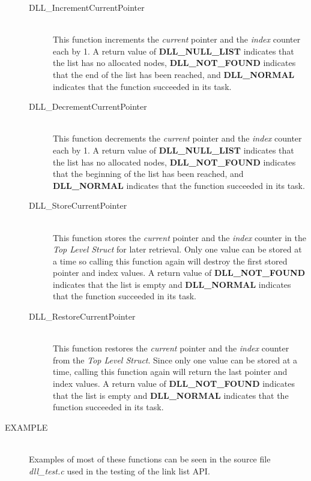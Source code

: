 \documentclass[10pt,letterpaper,titlepage]{article}
\begin{document}
\begin{description}
\begin{description}
\item[DLL\_IncrementCurrentPointer]\quad\\
 This function increments the \emph{current} pointer and the \emph{index} counter each by 1.  A return value of \textbf{DLL\_NULL\_LIST} indicates that the list has no allocated nodes, \textbf{DLL\_NOT\_FOUND} indicates that the end of the list has been reached, and \textbf{DLL\_NORMAL} indicates that the function succeeded in its task.

\item[DLL\_DecrementCurrentPointer]\quad\\
 This function decrements the \emph{current} pointer and the \emph{index} counter each by 1.  A return value of \textbf{DLL\_NULL\_LIST} indicates that the list has no allocated nodes, \textbf{DLL\_NOT\_FOUND} indicates that the beginning of the list has been reached, and \textbf{DLL\_NORMAL} indicates that the function succeeded in its task.

\item[DLL\_StoreCurrentPointer]\quad\\
 This function stores the \emph{current} pointer and the \emph{index} counter in the \emph{Top Level Struct} for later retrieval.  Only one value can be stored at a time so calling this function again will destroy the first stored pointer and index values.  A return value of \textbf{DLL\_NOT\_FOUND} indicates that the list is empty and \textbf{DLL\_NORMAL} indicates that the function succeeded in its task.

\item[DLL\_RestoreCurrentPointer]\quad\\
 This function restores the \emph{current} pointer and the \emph{index} counter from the \emph{Top Level Struct}.  Since only one value can be stored at a time, calling this function again will return the last pointer and index values.  A return value of \textbf{DLL\_NOT\_FOUND} indicates that the list is empty and \textbf{DLL\_NORMAL} indicates that the function succeeded in its task.
\end{description}

\item[EXAMPLE]\quad\\
Examples of most of these functions can be seen in the source file \emph{dll\_test.c} used in the testing of the link list API.

\end{description}
\newpage
\end{document}
